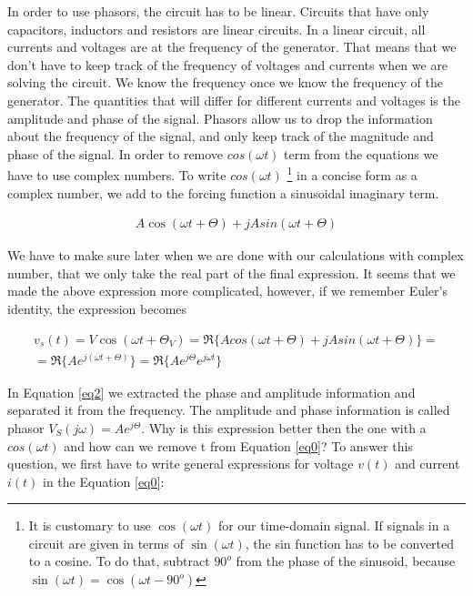 \documentclass{ximera}
\begin{document}
\begin{example}
In order to use phasors, the circuit has to be linear. Circuits that have  only capacitors, inductors and resistors are 
linear circuits.  In  a  linear circuit, all currents and voltages are  at the frequency of the generator. That means that we don't have to keep track  of the frequency of voltages and currents when we are solving the circuit. We know the frequency once we know the frequency of the generator. The quantities that will differ for different currents and voltages  is the amplitude and phase of the signal. Phasors allow us to drop the information about the frequency of the signal, and only  keep track of the magnitude and phase of the signal.
 In order to remove $cos (\omega t)$  term from the equations 
we have to use complex numbers.  To write $cos (\omega t)$ \footnote{It is customary to use  $\cos( \omega t)$ for our time-domain signal. If signals in a circuit are given in terms of $\sin (\omega t)$, the sin function has to be converted to a cosine. To do that, subtract $90^o$ from the phase of the sinusoid, because $\sin( \omega t) = \cos(\omega t - 90^o)$}  in a concise form  as a complex number, we add to the forcing function  a sinusoidal imaginary term.

\begin{eqnarray}
 A \cos (\omega t + \Theta ) + j A sin (\omega t + \Theta)
\end{eqnarray}

We have to make sure later  when we are done with our calculations with complex number, that we only take the real part of the final expression. It seems that we made the above expression more complicated,  however, if we
remember Euler's identity, the expression becomes


\begin{eqnarray}
v_s(t)=  V \cos (\omega t + \Theta_V)=\Re\{ A cos (\omega t + \Theta ) + j A sin (\omega t + \Theta)\}= \nonumber \\ 
= \Re\{A e^{j(\omega t + \Theta)}\}=\Re\{A e^{j \Theta} e^{j \omega t}\} \label{eq2}
\end{eqnarray}

In Equation \ref{eq2}  we  extracted the phase and amplitude information
and separated it from the frequency. The amplitude and phase information is called phasor $V_S (j \omega)=A e^{j \Theta}$. 
Why is this expression better then the one with a $cos(\omega t)$ and how can we remove t from  Equation \ref{eq0}? To answer this question, we first have to write general expressions for voltage $v(t)$ and current $ i(t)$ in the Equation \ref{eq0}:


\end{example}
\end{document}
